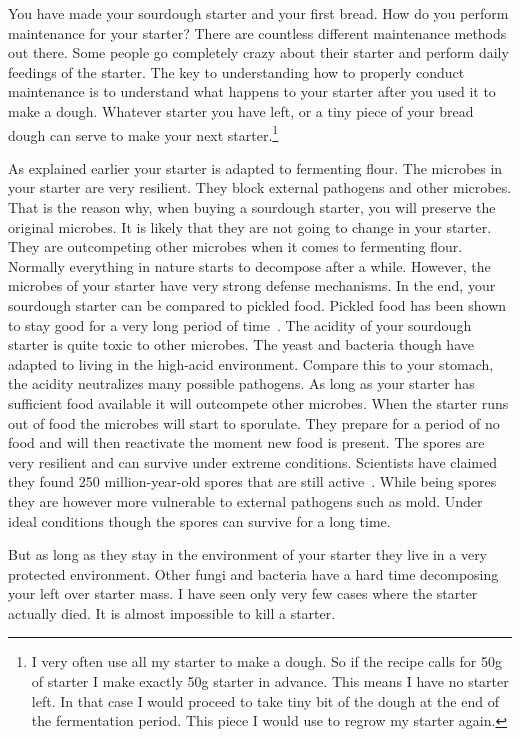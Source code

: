 You have made your sourdough starter and your first bread. How do you perform
maintenance for your starter? There are countless different maintenance
methods out there. Some people go completely crazy about their starter and
perform daily feedings of the starter. The key to understanding how to properly
conduct maintenance is to understand what happens to your starter after you
used it to make a dough. Whatever starter you have left, or a tiny piece of
your bread dough can serve to make your next starter.\footnote{I very often use all my
starter to make a dough. So if the recipe calls for 50g of starter I make
exactly 50g starter in advance. This means I have no starter left. In that
case I would proceed to take tiny bit of the dough at the end of the
fermentation period. This piece I would use to regrow my starter again.}


As explained earlier your starter is adapted
to fermenting flour. The microbes in your starter are very resilient. They
block external pathogens and other microbes. That is the reason why, when
buying a sourdough starter, you will preserve the original microbes. It is
likely that they are not going to change in your starter. They are outcompeting other
microbes when it comes to fermenting flour. Normally everything in nature
starts to decompose after a while. However, the microbes of your starter have
very strong defense mechanisms. In the end, your sourdough starter can be
compared to pickled food. Pickled food has been shown to stay good for a very
long period of time~\cite{pickled+foods+expiration}. The acidity of your sourdough starter is quite
toxic to other microbes. The yeast and bacteria though have adapted to living
in the high-acid environment. Compare this to your stomach, the acidity
neutralizes many possible pathogens. As long as your starter has sufficient
food available it will outcompete other microbes. When the starter runs out of
food the microbes will start to sporulate. They prepare for a period of no
food and will then reactivate the moment new food is present. The
spores are very resilient and can survive under extreme conditions.
Scientists have claimed they found 250 million-year-old spores that are still
active~\cite{old+spores}. While being spores
they are however more vulnerable to external pathogens such as mold.
Under ideal conditions though the spores can survive for a
long time.

But as long as they stay in the environment of your starter they live
in a very protected environment. Other fungi and bacteria have a hard time decomposing your left over starter mass.
I have seen only very few cases where the starter actually died. It is almost impossible
to kill a starter.

